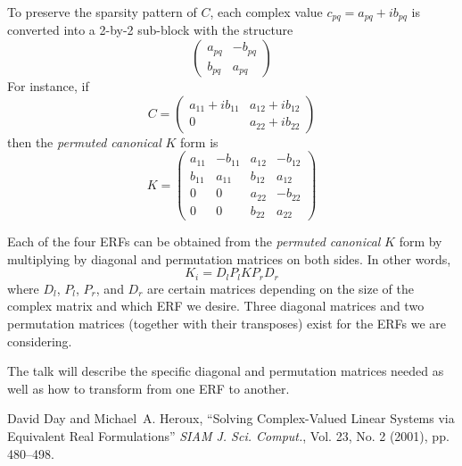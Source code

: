 \documentclass{report}
\begin{document}
To preserve the sparsity pattern of $C$, each complex value $c_{pq} =
a_{pq} + ib_{pq}$ is converted into a 2-by-2 sub-block with the structure
\begin{equation*} \left( \begin{array}{rr} a_{pq} & -b_{pq} \\ b_{pq} &
a_{pq} \end{array} \right) \end{equation*}
For instance, if
\begin{equation*} C = \left( \begin{array}{cc} a_{11} + i b_{11} & a_{12}
+ i b_{12} \\ 0 & a_{22} + i b_{22} \end{array} \right) \end{equation*}
then the \emph{permuted canonical} $K$ form is
\begin{equation*} K = \left( \begin{array}{cccc} a_{11} & -b_{11} &
a_{12} & -b_{12} \\ b_{11} & a_{11} & b_{12} & a_{12} \\ 0 & 0 & a_{22} &
-b_{22} \\ 0 & 0 & b_{22} & a_{22} \end{array} \right) \end{equation*}

Each of the four ERFs can be obtained from the \emph{permuted
canonical} $K$ form by multiplying by diagonal and permutation
matrices on both sides. In other words,
\begin{equation*} \label{kiform} K_i = D_l P_l K P_r D_r \end{equation*}
where $D_l$, $P_l$, $P_r$, and $D_r$ are certain matrices depending on
the size of the complex matrix and which ERF we desire. Three diagonal
matrices and two permutation matrices (together with their transposes)
exist for the ERFs we are considering.

The talk will describe the specific diagonal and permutation
matrices needed as well as how to transform from one ERF to another.

\begin{thebibliography}{1}
David Day and Michael~A. Heroux, ``Solving Complex-Valued Linear
Systems via Equivalent Real Formulations'' \emph{SIAM J. Sci.
Comput.}, Vol. 23, No. 2 (2001), pp. 480--498.
\end{thebibliography}
\end{document}

